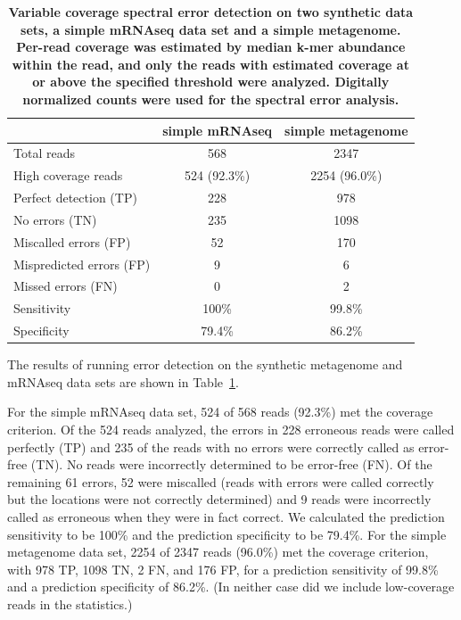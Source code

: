 \documentclass{article}
\begin{document}
\begin{table}
\begin{tabular}{|l|c||c|}
\hline
                            & {\bf simple mRNAseq } & {\bf simple metagenome}\\
\hline
Total reads                 & 568                   & 2347 \\
High coverage reads         & 524 (92.3\%)          & 2254 (96.0\%) \\
\hline
Perfect detection (TP)      & 228                   & 978 \\
No errors (TN)              & 235                   & 1098 \\
Miscalled errors (FP)       & 52                    & 170\\
Mispredicted errors (FP)    & 9                     & 6 \\
Missed errors (FN)          & 0                     & 2 \\
\hline
Sensitivity                 & 100\%                 & 99.8\% \\
Specificity                 & 79.4\%                & 86.2\% \\
\hline
\end{tabular}

\caption{{\bf Variable coverage spectral error detection on two synthetic
  data sets, a simple mRNAseq data set and a simple metagenome.
  Per-read coverage was estimated by median k-mer abundance within the
  read, and only the reads with estimated coverage at or above the
  specified threshold were analyzed.  Digitally normalized counts were
  used for the spectral error analysis.}}
\label{tab:spectra_variable}
\end{table}

The results of running error detection on the synthetic metagenome and
mRNAseq data sets are shown in Table~\ref{tab:spectra_variable}.

For the simple mRNAseq data
set, 524 of 568 reads (92.3\%) met the coverage criterion.  Of the
524 reads analyzed, the errors in 228 erroneous reads were called
perfectly (TP) and 235 of the reads with no errors were correctly
called as error-free (TN).  No reads were incorrectly determined
to be error-free (FN).  Of the remaining 61 errors, 52 were miscalled
(reads with errors were called correctly but the locations were
not correctly determined) and 9 reads were incorrectly called as erroneous
when they were in fact correct.  We calculated the prediction
sensitivity to be 100\% and the prediction specificity to be
79.4\%.
For the simple metagenome data set,
2254 of 2347 reads (96.0\%) met the coverage criterion, with 978 TP,
1098 TN, 2 FN, and 176 FP, for a prediction sensitivity of 99.8\% and
a prediction specificity of 86.2\%.  (In neither case did we include
low-coverage reads in the statistics.)
\end{document}
